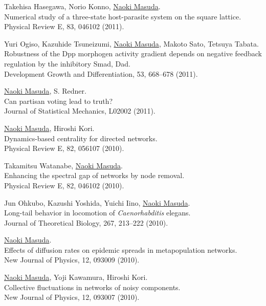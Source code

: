 \documentclass[11pt,letter]{article}
\begin{document}
\begin{etaremune}
\item Takehisa Hasegawa, Norio Konno, \underline{Naoki Masuda}.\\
Numerical study of a three-state host-parasite system on the square lattice.\\
Physical Review E, 83, 046102 (2011).

\item Yuri Ogiso, Kazuhide Tsuneizumi, \underline{Naoki Masuda}, Makoto Sato, Tetsuya Tabata.\\
Robustness of the Dpp morphogen activity gradient depends on negative feedback regulation by the inhibitory Smad, Dad.\\
Development Growth and Differentiation, 53, 668--678 (2011).

\item \underline{Naoki Masuda}, S. Redner.\\
Can partisan voting lead to truth?\\
Journal of Statistical Mechanics, L02002 (2011).

\item \underline{Naoki Masuda}, Hiroshi Kori.\\
Dynamics-based centrality for directed networks.\\
Physical Review E, 82, 056107 (2010).

\item Takamitsu Watanabe, \underline{Naoki Masuda}.\\
Enhancing the spectral gap of networks by node removal.\\
Physical Review E, 82, 046102 (2010).

\item Jun Ohkubo, Kazushi Yoshida, Yuichi Iino, \underline{Naoki Masuda}.\\
Long-tail behavior in locomotion of \textit{Caenorhabditis} elegans.\\
Journal of Theoretical Biology, 267, 213--222 (2010).

\item \underline{Naoki Masuda}.\\
Effects of diffusion rates on epidemic spreads in metapopulation networks.\\
New Journal of Physics, 12, 093009 (2010).

\item \underline{Naoki Masuda}, Yoji Kawamura, Hiroshi Kori.\\
Collective fluctuations in networks of noisy components.\\
New Journal of Physics, 12, 093007 (2010).


\end{etaremune}
\end{document}
